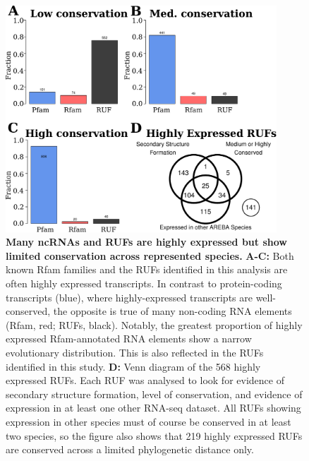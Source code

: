 \documentclass[10pt]{article}
\begin{document}
\begin{figure}[!ht]
\begin{center}
\includegraphics[width=4in]{figures/figure2.pdf}
\end{center}
\caption{ {\bf Many ncRNAs and RUFs are highly expressed
    but show limited conservation across represented species.} {\bf
    A-C:} Both known Rfam families and the RUFs identified in this
  analysis are often highly expressed
  transcripts. In contrast to protein-coding transcripts (blue), where
  highly-expressed transcripts are well-conserved, the opposite is
  true of many non-coding RNA elements (Rfam, red; RUFs,
  black). Notably, the greatest proportion of highly expressed
  Rfam-annotated RNA elements show a narrow evolutionary
  distribution. This is also reflected in the RUFs identified in this
  study. {\bf D:} Venn diagram of the 568 highly expressed RUFs. Each
  RUF was analysed to look for evidence of secondary structure
  formation, level of conservation, and evidence of expression in at
  least one other RNA-seq dataset. All RUFs showing expression in
  other species must of course be conserved in at least two
  species, so the figure also shows that 219 highly expressed RUFs are
  conserved across a limited phylogenetic distance only.}
\label{fig:2}
\end{figure}
\end{document}
